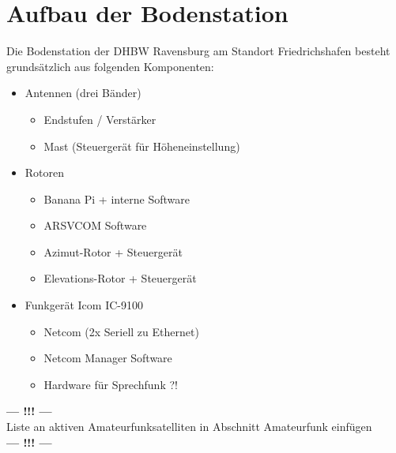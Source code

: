 
\chapter{Aufbau der Bodenstation}

Die Bodenstation der DHBW Ravensburg am Standort Friedrichshafen besteht grundsätzlich aus folgenden Komponenten:

\begin{itemize}
	\parskip0pt
	\item Antennen (drei Bänder)
	\begin{itemize}
		\item Endstufen / Verstärker
		\item Mast (Steuergerät für Höheneinstellung)
	\end{itemize}
	\item Rotoren
	\begin{itemize}
		\item Banana Pi + interne Software
		\item ARSVCOM Software
		\item Azimut-Rotor + Steuergerät
		\item Elevations-Rotor + Steuergerät
	\end{itemize}
	\item Funkgerät Icom IC-9100
	\begin{itemize}
		\item Netcom (2x Seriell zu Ethernet)
		\item Netcom Manager Software
		\item Hardware für Sprechfunk ?!
	\end{itemize}
\end{itemize}

\begin{center}
	\Large{\textbf{--- !!! ---}\\Liste an aktiven Amateurfunksatelliten in Abschnitt Amateurfunk einfügen\\\textbf{--- !!! ---}}
\end{center}

